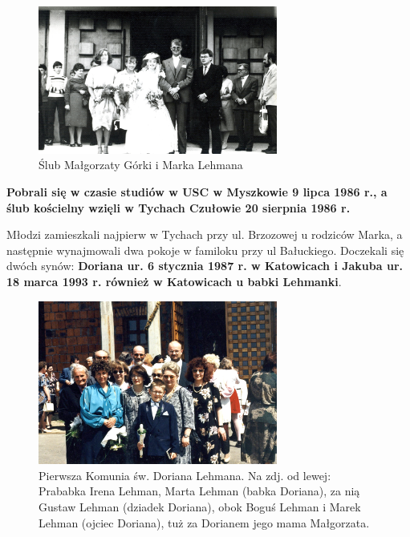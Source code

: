 \begin{figure}[!h]
\begin{center}
\includegraphics[width=0.7\textwidth]{photo/marek_malgorzata_lehman_slub.jpg}
\caption{Ślub Małgorzaty Górki i Marka Lehmana}
\label{rys:marek_malgorzata_lehman_slub}
\end{center}
\end{figure}

\textbf{Pobrali się w czasie studiów w USC w Myszkowie 9 lipca 1986 r., a ślub kościelny wzięli w Tychach Czułowie 20 sierpnia 1986 r.}

Młodzi zamieszkali najpierw w Tychach przy ul. Brzozowej u rodziców Marka, a następnie wynajmowali dwa pokoje w familoku przy ul Bałuckiego. Doczekali się dwóch synów: \textbf{Doriana ur. 6 stycznia 1987 r. w Katowicach i Jakuba ur. 18 marca 1993 r. również w Katowicach u babki Lehmanki}.

\begin{figure}[!h]
\begin{center}
\includegraphics[width=0.7\textwidth]{photo/dorian_lehman_komunia.jpg}
\caption[Pierwsza Komunia św. Doriana Lehmana]{Pierwsza Komunia św. Doriana Lehmana. Na zdj. od lewej: Prababka Irena Lehman, Marta Lehman (babka Doriana), za nią Gustaw Lehman (dziadek Doriana), obok Boguś Lehman i Marek Lehman (ojciec Doriana), tuż za Dorianem jego mama Małgorzata.}
\label{rys:dorian_lehman_komunia}
\end{center}
\end{figure}

